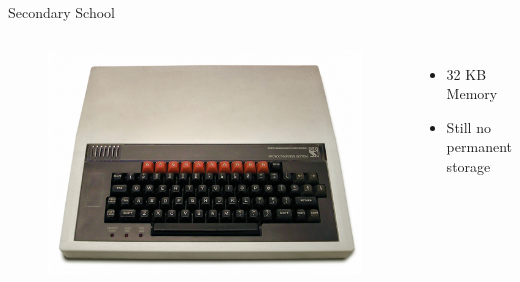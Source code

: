 \documentclass{beamer}
\begin{document}
  \begin{frame}{Secondary School}
    \begin{columns}
        \begin{figure}
          \includegraphics[scale=0.2]{images/bbc_micro}
        \end{figure}
      \begin{itemize}
          \item 32 KB Memory
          \item Still no permanent storage
        \end{itemize}
    \end{columns}
  \end{frame}
\end{document}
